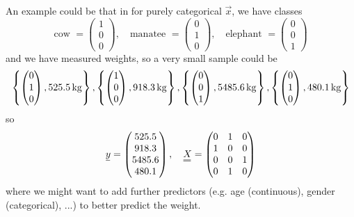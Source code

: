 An example could be that in for purely categorical $\vec{x}$, we have classes
\begin{equation}
    \text{cow } = \begin{pmatrix} 1 \\ 0 \\ 0 \end{pmatrix}, \quad \text{manatee } = \begin{pmatrix} 0 \\ 1 \\ 0 \end{pmatrix}, \quad \text{elephant } = \begin{pmatrix} 0 \\ 0 \\ 1 \end{pmatrix}
\end{equation}
and we have measured weights, so a very small sample could be
\begin{equation}
    \left\{ \begin{pmatrix} 0 \\ 1 \\ 0 \end{pmatrix}, 525.5\operatorname{kg} \right\}, \left\{ \begin{pmatrix} 1 \\ 0 \\ 0 \end{pmatrix}, 918.3\operatorname{kg} \right\}, \left\{ \begin{pmatrix} 0 \\ 0 \\ 1 \end{pmatrix}, 5485.6\operatorname{kg} \right\}, \left\{ \begin{pmatrix} 0 \\ 1 \\ 0 \end{pmatrix}, 480.1\operatorname{kg} \right\}
\end{equation}
so
\begin{equation}
    \begin{gathered}
        \vec{y} = \begin{pmatrix} 525.5 \\ 918.3 \\ 5485.6 \\ 480.1 \end{pmatrix}, \quad \mat{X} = \begin{pmatrix} 0 & 1 & 0 \\ 1 & 0 & 0 \\ 0 & 0 & 1 \\ 0 & 1 & 0 \end{pmatrix}
    \end{gathered}
\end{equation}
where we might want to add further predictors (e.g. age (continuous), gender (categorical), ...) to 
better predict the weight.

